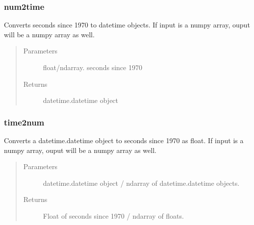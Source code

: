 \documentclass[letterpaper,10pt,english]{sphinxmanual}
\begin{document}
\subsubsection{num2time}
\label{\detokenize{generated/MPPy.tools.tools.num2time:num2time}}\label{\detokenize{generated/MPPy.tools.tools.num2time::doc}}

\begin{fulllineitems}
\label{\detokenize{generated/MPPy.tools.tools.num2time:MPPy.tools.tools.num2time}}
Converts seconds since 1970 to datetime objects.
If input is a numpy array, ouput will be a numpy array as well.
\begin{quote}\begin{description}
\item[{Parameters}] \leavevmode
{} \textendash{} float/ndarray.  seconds since 1970

\item[{Returns}] \leavevmode
datetime.datetime object

\end{description}\end{quote}

\end{fulllineitems}



\subsubsection{time2num}
\label{\detokenize{generated/MPPy.tools.tools.time2num:time2num}}\label{\detokenize{generated/MPPy.tools.tools.time2num::doc}}

\begin{fulllineitems}
\label{\detokenize{generated/MPPy.tools.tools.time2num:MPPy.tools.tools.time2num}}
Converts a datetime.datetime object to seconds since 1970 as float.
If input is a numpy array, ouput will be a numpy array as well.
\begin{quote}\begin{description}
\item[{Parameters}] \leavevmode
{} \textendash{} datetime.datetime object / ndarray of datetime.datetime objects.

\item[{Returns}] \leavevmode
Float of seconds since 1970 / ndarray of floats.

\end{description}\end{quote}

\end{fulllineitems}
\end{document}
